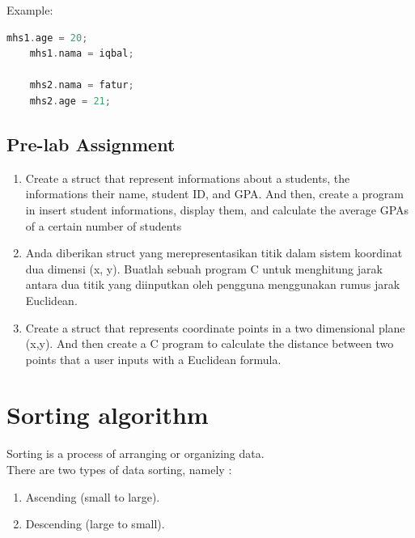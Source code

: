 Example:
\begin{lstlisting}[language=c]
    mhs1.age = 20;
    mhs1.nama = iqbal;
    
    mhs2.nama = fatur;
    mhs2.age = 21;
\end{lstlisting}

\subsection{Pre-lab Assignment}
\begin{enumerate}
    \item Create a struct that represent informations about a students, the informations their name, student ID, and GPA.
          And then, create a program in insert student informations, display them, and calculate the average GPAs of a
          certain number of students
    \item Anda diberikan struct yang merepresentasikan titik dalam sistem koordinat dua dimensi (x, y).
          Buatlah sebuah program C untuk menghitung jarak antara dua titik yang diinputkan oleh pengguna menggunakan rumus jarak Euclidean.
    \item Create a struct that represents coordinate points in a two dimensional plane (x,y). And then create a C program to calculate
          the distance between two points that a user inputs with a Euclidean formula.
\end{enumerate}

\section{Sorting algorithm}
Sorting is a process of arranging or organizing data.\\
There are two types of data sorting, namely :
\begin{enumerate}
    \item Ascending (small to large).
    \item Descending (large to small).
\end{enumerate}

